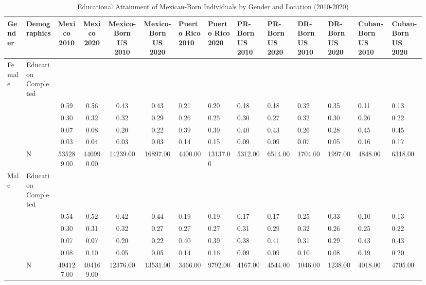 \begin{table}[ht]
\centering
\caption{Educational Attainment of Mexican-Born Individuals by Gender and Location (2010-2020)} 
\begingroup\small
\begin{tabular}{l>{\raggedright\arraybackslash}p{3.2cm}|cccc}
  \hline
Gender & Demographics & Mexico 2010 & Mexico 2020 & Mexico-Born US 2010 & Mexico-Born US 2020 & Puerto Rico 2010 & Puerto Rico 2020 & PR-Born US 2010 & PR-Born US 2020 & DR-Born US 2010 & DR-Born US 2020 & Cuban-Born US 2010 & Cuban-Born US 2020 \\ 
  \hline
Female & Education Completed &  &  &  &  &  &  &  &  &  &  &  &  \\ 
   &  & 0.59 & 0.56 & 0.43 & 0.43 & 0.21 & 0.20 & 0.18 & 0.18 & 0.32 & 0.35 & 0.11 & 0.13 \\ 
   &  & 0.30 & 0.32 & 0.32 & 0.29 & 0.26 & 0.25 & 0.30 & 0.27 & 0.32 & 0.30 & 0.26 & 0.22 \\ 
   &  & 0.07 & 0.08 & 0.20 & 0.22 & 0.39 & 0.39 & 0.40 & 0.43 & 0.26 & 0.28 & 0.45 & 0.45 \\ 
   &  & 0.03 & 0.04 & 0.03 & 0.03 & 0.14 & 0.15 & 0.09 & 0.09 & 0.07 & 0.05 & 0.16 & 0.17 \\ 
   & N & 535289.00 & 440990.00 & 14239.00 & 16897.00 & 4400.00 & 13137.00 & 5312.00 & 6514.00 & 1704.00 & 1997.00 & 4848.00 & 6318.00 \\ 
  Male & Education Completed &  &  &  &  &  &  &  &  &  &  &  &  \\ 
   &  & 0.54 & 0.52 & 0.42 & 0.44 & 0.19 & 0.19 & 0.17 & 0.17 & 0.25 & 0.33 & 0.10 & 0.13 \\ 
   &  & 0.30 & 0.31 & 0.32 & 0.27 & 0.27 & 0.27 & 0.31 & 0.29 & 0.32 & 0.26 & 0.25 & 0.22 \\ 
   &  & 0.07 & 0.07 & 0.20 & 0.22 & 0.40 & 0.39 & 0.38 & 0.41 & 0.31 & 0.29 & 0.43 & 0.43 \\ 
   &  & 0.08 & 0.10 & 0.05 & 0.05 & 0.14 & 0.16 & 0.09 & 0.09 & 0.10 & 0.08 & 0.19 & 0.20 \\ 
   & N & 494127.00 & 404169.00 & 12376.00 & 13531.00 & 3466.00 & 9792.00 & 4167.00 & 4544.00 & 1046.00 & 1238.00 & 4018.00 & 4705.00 \\ 
   \hline
\end{tabular}
\endgroup
\end{table}
